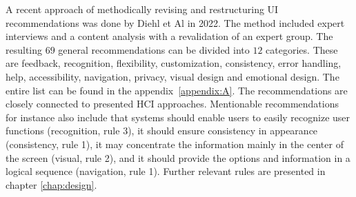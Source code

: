A recent approach of methodically revising and restructuring \ac{UI} recommendations was done by Diehl et Al in 2022\cite{diehl_defining_2022}. The method included expert interviews and a content analysis with a revalidation of an expert group.
The resulting $69$ general recommendations can be divided into $12$ categories. These are feedback, recognition, flexibility, customization, consistency, error handling, help, accessibility, navigation, privacy, visual design and emotional design. The entire list can be found in the appendix~\ref{appendix:A}.
The recommendations are closely connected to presented \ac{HCI} approaches. Mentionable recommendations for instance also include that systems should enable users to easily recognize user functions (recognition, rule 3), it should ensure consistency in appearance (consistency, rule 1), it may concentrate the information mainly in the center of the screen (visual, rule 2), and it should provide the options and information in a logical sequence (navigation, rule 1). Further relevant rules are presented in chapter \ref{chap:design}.



















